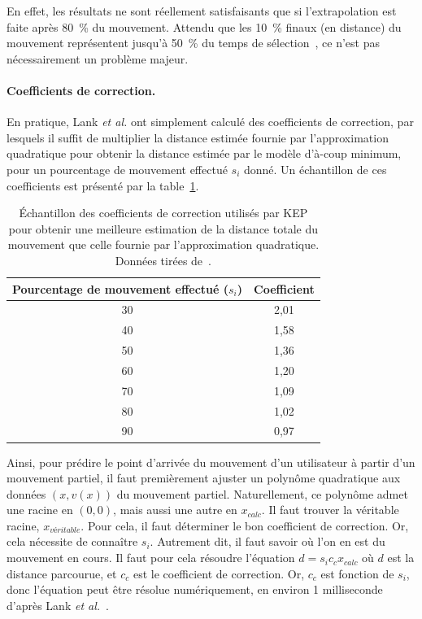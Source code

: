 	En effet, les résultats ne sont réellement satisfaisants que si l'extrapolation est faite après 80~\%{} du mouvement. Attendu que les 10~\%{} finaux (en distance) du mouvement représentent jusqu'à 50~\%{} du temps de sélection~\cite{mackenzie1987three, graham1996physical}, ce n'est pas nécessairement un problème majeur.
	
	\paragraph{Coefficients de correction.}
	En pratique, Lank \emph{et al.} ont simplement calculé des coefficients de correction, par lesquels il suffit de multiplier la distance estimée fournie par l'approximation quadratique pour obtenir la distance estimée par le modèle d'à-coup minimum, pour un pourcentage de mouvement effectué $s_{i}$ donné. Un échantillon de ces coefficients est présenté par la table~\ref{tab:kepCoeffs}.
	
	\begin{table}
	\centering
	\begin{tabular}{c c}
		Pourcentage de mouvement effectué ($s_{i}$)	& Coefficient	\bigstrut[b] \\ \hline
		30												& 2,01			\bigstrut[t] \\
		40												& 1,58			\\
		50												& 1,36			\\
		60												& 1,20			\\
		70												& 1,09			\\
		80												& 1,02			\\
		90												& 0,97			\\		
	\end{tabular}
	\caption[KEP --- Coefficients de correction]{Échantillon des coefficients de correction utilisés par KEP pour obtenir une meilleure estimation de la distance totale du mouvement que celle fournie par l'approximation quadratique. Données tirées de~\cite{lank2007endpoint}.}
	\label{tab:kepCoeffs}
	\end{table}
	
	Ainsi, pour prédire le point d'arrivée du mouvement d'un utilisateur à partir d'un mouvement partiel, il faut premièrement ajuster un polynôme quadratique aux données $(x, v(x))$ du mouvement partiel. Naturellement, ce polynôme admet une racine en $(0,0)$, mais aussi une autre en $x_{calc}$. Il faut trouver la véritable racine, $x_{véritable}$. Pour cela, il faut déterminer le bon coefficient de correction. Or, cela nécessite de connaître $s_{i}$. Autrement dit, il faut savoir où l'on en est du mouvement en cours. Il faut pour cela résoudre l'équation $d = s_{i}c_{c}x_{calc}$ où $d$ est la distance parcourue, et $c_{c}$ est le coefficient de correction. Or, $c_{c}$ est fonction de $s_{i}$, donc l'équation peut être résolue numériquement, en environ 1 milliseconde d'après Lank \emph{et al.}~\cite{lank2007endpoint}.
	
